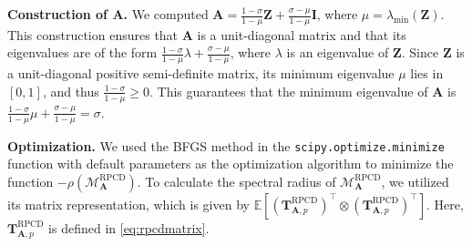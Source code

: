\documentclass{article}
\theoremstyle{plain}
\theoremstyle{definition}
\theoremstyle{remark}
\def\bigclosed#1{\left[#1\right]}
\newcommand{\RPCD}{\text{RPCD}} %
\newcommand{\MARPCD}{\mathcal{M}_{\bm{A}}^{\RPCD}} %
\def\mA{{\bm{A}}}
\def\mI{{\bm{I}}}
\def\mT{{\bm{T}}}
\def\mZ{{\bm{Z}}}
\newcommand{\E}{\mathbb{E}}
\begin{document}
\textbf{Construction of $\mA$.}
We computed $\mA = \frac{1 - \sigma}{1 - \mu} \mZ + \frac{\sigma - \mu}{1 - \mu} \mI$, where $\mu = \lambda_{\min} (\mZ)$. 
This construction ensures that $\mA$ is a unit-diagonal matrix and that its eigenvalues are of the form $\frac{1 - \sigma}{1 - \mu} \lambda + \frac{\sigma - \mu}{1 - \mu}$, where $\lambda$ is an eigenvalue of $\mZ$. 
Since $\mZ$ is a unit-diagonal positive semi-definite matrix, its minimum eigenvalue $\mu$ lies in $[0, 1]$, and thus $\frac{1 - \sigma}{1 - \mu} \geq 0$. 
This guarantees that the minimum eigenvalue of $\mA$ is $\frac{1 - \sigma}{1 - \mu} \mu + \frac{\sigma - \mu}{1 - \mu} = \sigma$.

\textbf{Optimization.}
We used the BFGS method in the \texttt{scipy.optimize.minimize} function with default parameters as the optimization algorithm to minimize the function $-\rho(\MARPCD)$. To calculate the spectral radius of $\MARPCD$, we utilized its matrix representation, which is given by $\E \bigclosed{(\mT_{\mA, p}^{\text{RPCD}})^{\top} \otimes (\mT_{\mA, p}^{\text{RPCD}})^{\top}}$. Here, $\mT_{\mA, p}^{\text{RPCD}}$ is defined in \cref{eq:rpcdmatrix}.
\end{document}
